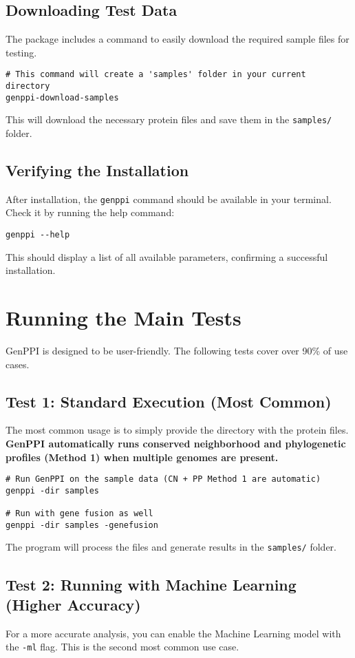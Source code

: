 \documentclass[11pt, a4paper]{article}
\begin{document}
\subsection{Downloading Test Data}
The package includes a command to easily download the required sample files for testing.
\begin{lstlisting}[style=bashstyle]
# This command will create a 'samples' folder in your current directory
genppi-download-samples
\end{lstlisting}
This will download the necessary protein files and save them in the \texttt{samples/} folder.

\subsection{Verifying the Installation}
After installation, the \texttt{genppi} command should be available in your terminal. Check it by running the help command:
\begin{lstlisting}[style=bashstyle]
genppi --help
\end{lstlisting}
This should display a list of all available parameters, confirming a successful installation.

\section{Running the Main Tests}
GenPPI is designed to be user-friendly. The following tests cover over 90\% of use cases.

\subsection{Test 1: Standard Execution (Most Common)}
The most common usage is to simply provide the directory with the protein files. \textbf{GenPPI automatically runs conserved neighborhood and phylogenetic profiles (Method 1) when multiple genomes are present.}
\begin{lstlisting}[style=bashstyle]
# Run GenPPI on the sample data (CN + PP Method 1 are automatic)
genppi -dir samples

# Run with gene fusion as well
genppi -dir samples -genefusion
\end{lstlisting}
The program will process the files and generate results in the \texttt{samples/} folder.

\subsection{Test 2: Running with Machine Learning (Higher Accuracy)}
For a more accurate analysis, you can enable the Machine Learning model with the \texttt{-ml} flag. This is the second most common use case.
\end{document}
